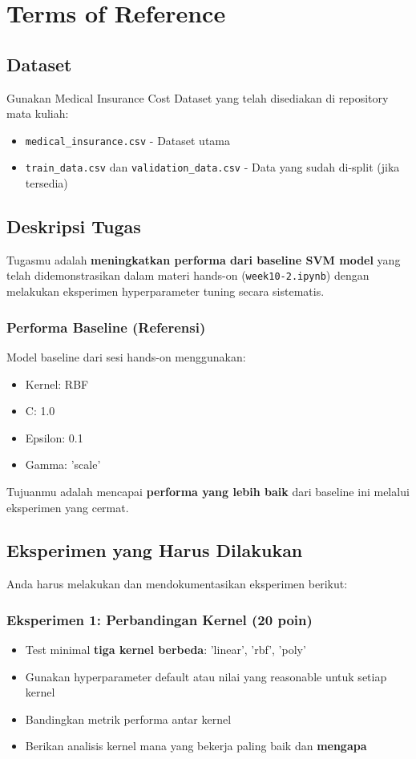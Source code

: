 \documentclass[12pt,a4paper]{article}
\begin{document}
\section{Terms of Reference}

\subsection{Dataset}
Gunakan Medical Insurance Cost Dataset yang telah disediakan di repository mata kuliah:
\begin{itemize}
    \item \texttt{medical\_insurance.csv} - Dataset utama
    \item \texttt{train\_data.csv} dan \texttt{validation\_data.csv} - Data yang sudah di-split (jika tersedia)
\end{itemize}

\subsection{Deskripsi Tugas}

Tugasmu adalah \textbf{meningkatkan performa dari baseline SVM model} yang telah didemonstrasikan dalam materi hands-on (\texttt{week10-2.ipynb}) dengan melakukan eksperimen hyperparameter tuning secara sistematis.

\subsubsection{Performa Baseline (Referensi)}
Model baseline dari sesi hands-on menggunakan:
\begin{itemize}
    \item Kernel: RBF
    \item C: 1.0
    \item Epsilon: 0.1
    \item Gamma: 'scale'
\end{itemize}

Tujuanmu adalah mencapai \textbf{performa yang lebih baik} dari baseline ini melalui eksperimen yang cermat.

\subsection{Eksperimen yang Harus Dilakukan}

Anda harus melakukan dan mendokumentasikan eksperimen berikut:

\subsubsection{Eksperimen 1: Perbandingan Kernel (20 poin)}
\begin{itemize}
    \item Test minimal \textbf{tiga kernel berbeda}: 'linear', 'rbf', 'poly'
    \item Gunakan hyperparameter default atau nilai yang reasonable untuk setiap kernel
    \item Bandingkan metrik performa antar kernel
    \item Berikan analisis kernel mana yang bekerja paling baik dan \textbf{mengapa}
\end{itemize}
\end{document}
